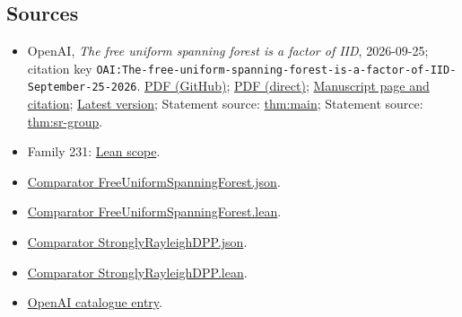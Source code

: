 \documentclass[11pt]{article}
\begin{document}
\subsection{Sources}
\begin{itemize}
\item OpenAI, \emph{The free uniform spanning forest is a factor of IID}, 2026-09-25; citation key \texttt{OAI:The-free-uniform-spanning-forest-is-a-factor-of-IID-September-25-2026}. \href{https://github.com/openai/math/blob/adc7f1241b42e322a6451854ab7e4b4c146bf78a/preprints/The-free-uniform-spanning-forest-is-a-factor-of-IID-September-25-2026/The-free-uniform-spanning-forest-is-a-factor-of-IID-September-25-2026.pdf}{PDF (GitHub)}; \href{https://github.com/openai/math/raw/adc7f1241b42e322a6451854ab7e4b4c146bf78a/preprints/The-free-uniform-spanning-forest-is-a-factor-of-IID-September-25-2026/The-free-uniform-spanning-forest-is-a-factor-of-IID-September-25-2026.pdf}{PDF (direct)}; \href{https://github.com/openai/math/blob/adc7f1241b42e322a6451854ab7e4b4c146bf78a/preprints/The-free-uniform-spanning-forest-is-a-factor-of-IID-September-25-2026/README.md}{Manuscript page and citation}; \href{https://github.com/openai/math/blob/main/preprints/The-free-uniform-spanning-forest-is-a-factor-of-IID-September-25-2026/The-free-uniform-spanning-forest-is-a-factor-of-IID-September-25-2026.pdf}{Latest version}; Statement source: \href{https://github.com/openai/math/blob/adc7f1241b42e322a6451854ab7e4b4c146bf78a/preprints/The-free-uniform-spanning-forest-is-a-factor-of-IID-September-25-2026/build/sections/introduction.tex\#L54}{thm:main}; Statement source: \href{https://github.com/openai/math/blob/adc7f1241b42e322a6451854ab7e4b4c146bf78a/preprints/The-free-uniform-spanning-forest-is-a-factor-of-IID-September-25-2026/build/sections/introduction.tex\#L102}{thm:sr-group}.
\item Family 231: \href{https://github.com/openai/math/blob/adc7f1241b42e322a6451854ab7e4b4c146bf78a/lean/docs/231.md}{Lean scope}.
\item \href{https://github.com/openai/math/blob/adc7f1241b42e322a6451854ab7e4b4c146bf78a/lean/ComparatorChallenges/FreeUniformSpanningForest.json}{Comparator FreeUniformSpanningForest.json}.
\item \href{https://github.com/openai/math/blob/adc7f1241b42e322a6451854ab7e4b4c146bf78a/lean/ComparatorChallenges/FreeUniformSpanningForest.lean}{Comparator FreeUniformSpanningForest.lean}.
\item \href{https://github.com/openai/math/blob/adc7f1241b42e322a6451854ab7e4b4c146bf78a/lean/ComparatorChallenges/StronglyRayleighDPP.json}{Comparator StronglyRayleighDPP.json}.
\item \href{https://github.com/openai/math/blob/adc7f1241b42e322a6451854ab7e4b4c146bf78a/lean/ComparatorChallenges/StronglyRayleighDPP.lean}{Comparator StronglyRayleighDPP.lean}.
\item \href{https://github.com/openai/math/blob/adc7f1241b42e322a6451854ab7e4b4c146bf78a/CONTENTS.md}{OpenAI catalogue entry}.
\end{itemize}
\end{document}

